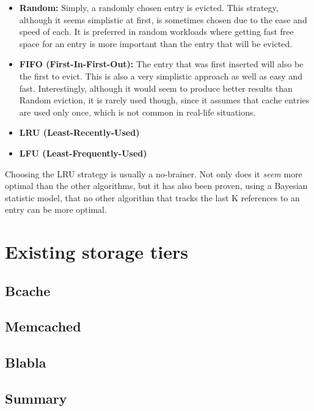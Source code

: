 %
\begin{itemize}
	\item \textbf{Random:} Simply, a randomly chosen entry is evicted. This 
		strategy, although it seems simplistic at first, is sometimes chosen 
		due to the ease and speed of each. It is preferred in random workloads 
		where getting fast free space for an entry is more important than the 
		entry that will be evicted.
	\item \textbf{FIFO (First-In-First-Out):} The entry that was first inserted 
		will also be the first to evict. This is also a very simplistic 
		approach as well as easy and fast. Interestingly, although it would 
		seem to produce better results than Random eviction, it is rarely used 
		though, since it assumes that cache entries are used only once, which 
		is not common in real-life situations.
	\item \textbf{LRU (Least-Recently-Used)}
	\item \textbf{LFU (Least-Frequently-Used)}
\end{itemize}

Choosing the LRU strategy is usually a no-brainer. Not only does it 
\textit{seem} more optimal than the other algorithms, but it has also been 
proven, using a Bayesian statistic model, that no other algorithm that tracks 
the last K references to an entry can be more optimal.



\section{Existing storage tiers}

\subsection{Bcache}

\subsection{Memcached}

\subsection{Blabla}

\subsection{Summary}





